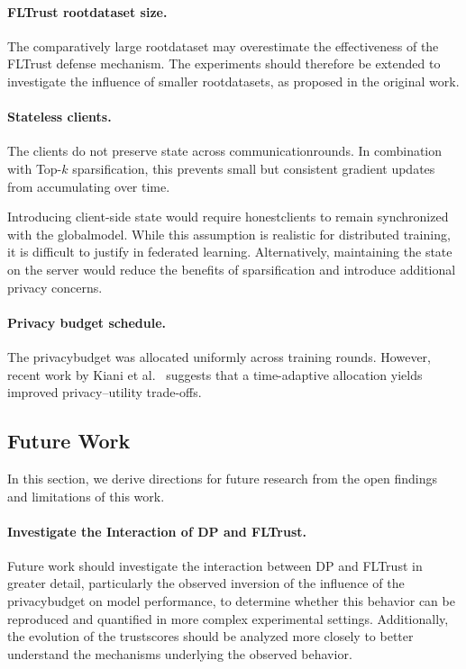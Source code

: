 \documentclass[11pt,twocolumn,a4paper,DIV=calc,parskip=half]{scrartcl}
\begin{document}
	\paragraph{FLTrust \gls{rootdataset} size.}
	The comparatively large \gls{rootdataset} may overestimate the effectiveness of the FLTrust defense mechanism. The experiments should therefore be extended to investigate the influence of smaller \glspl{rootdataset}, as proposed in the original work.
	
	\paragraph{Stateless clients.}
	The clients do not preserve state across \glspl{communicationround}. In combination with Top-$k$ sparsification, this prevents small but consistent gradient updates from accumulating over time.
	
	Introducing client-side state would require \glspl{honestclient} to remain synchronized with the \gls{globalmodel}. While this assumption is realistic for distributed training, it is difficult to justify in federated learning. Alternatively, maintaining the state on the server would reduce the benefits of sparsification and introduce additional privacy concerns.
	
	\paragraph{Privacy budget schedule.}
	The \gls{privacybudget} was allocated uniformly across training rounds. However, recent work by Kiani et al.~\cite{kiani2025differentiallyprivatefederatedlearning} suggests that a time-adaptive allocation yields improved privacy--utility trade-offs.
	
	\subsection{Future Work}
	
	In this section, we derive directions for future research from the open findings and limitations of this work.
	
	\paragraph{Investigate the Interaction of \ac{DP} and FLTrust.}
	Future work should investigate the interaction between \ac{DP} and FLTrust in greater detail, particularly the observed inversion of the influence of the \gls{privacybudget} on model performance, to determine whether this behavior can be reproduced and quantified in more complex experimental settings. Additionally, the evolution of the \glspl{trustscore} should be analyzed more closely to better understand the mechanisms underlying the observed behavior.
	
\end{document}
